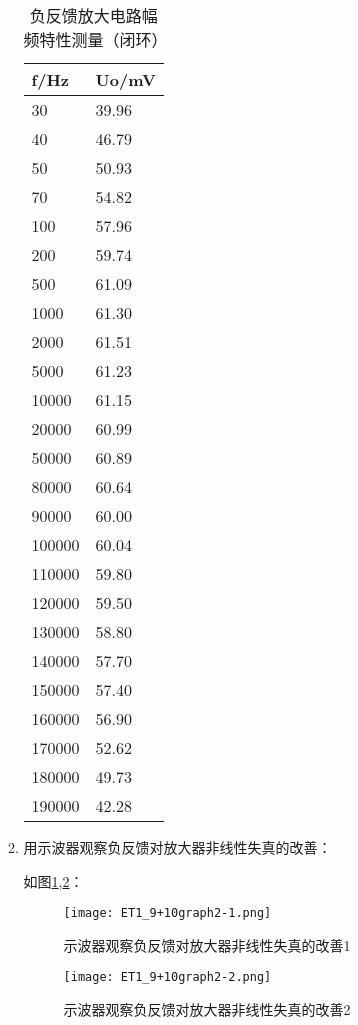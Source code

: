 \documentclass[dvipsnames, svgnames,a4paper,11pt]{article}
\begin{document}
\begin{itemize}
\begin{enumerate}
\begin{table}[htbp]
\begin{minipage}{.5\linewidth}
							\centering
							\begin{tabular}{|ll|}
								\hline
								f/Hz & Uo/mV \\
								\hline
								30 & 39.96 \\
								40 & 46.79 \\
								50 & 50.93 \\
								70 & 54.82 \\
								100 & 57.96 \\
								200 & 59.74 \\
								500 & 61.09 \\
								1000 & 61.30 \\
								2000 & 61.51 \\
								5000 & 61.23 \\
								10000 & 61.15 \\
								20000 & 60.99 \\
								50000 & 60.89 \\
								80000 & 60.64 \\
								90000 & 60.00 \\
								100000 & 60.04 \\
								110000 & 59.80 \\
								120000 & 59.50 \\
								130000 & 58.80 \\
								140000 & 57.70 \\
								150000 & 57.40 \\
								160000 & 56.90 \\
								170000 & 52.62 \\
								180000 & 49.73 \\
								190000 & 42.28 \\
								\hline
							\end{tabular}
							\caption{负反馈放大电路幅频特性测量（闭环）}
							\label{tbl:table7-2}
						\end{minipage}
					\end{table}


				\item 用示波器观察负反馈对放大器非线性失真的改善：
				

				如图\cref{fig:fig2-1},\cref{fig:fig2-2}：
				\begin{figure}[htbp]
					\centering
					\texttt{[image: ET1\_9+10graph2-1.png]}
					\caption{示波器观察负反馈对放大器非线性失真的改善1}
					\label{fig:fig2-1}
				\end{figure}


				\begin{figure}[htbp]
					\centering
					\texttt{[image: ET1\_9+10graph2-2.png]}
					\caption{示波器观察负反馈对放大器非线性失真的改善2}
					\label{fig:fig2-2}
				\end{figure}
				
					
			\end{enumerate}
		

	\end{itemize}	
	
\end{document}
